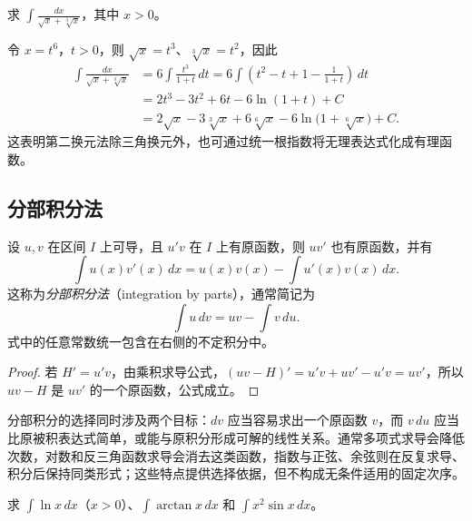 \begin{example}
\label{ex:common-denominator-substitution-for-radicals}
求 $\displaystyle\int\frac{dx}{\sqrt{x}+\sqrt[3]{x}}$，其中 $x>0$。
\end{example}

\begin{solve}
令 $x=t^6$，$t>0$，则 $\sqrt{x}=t^3$、$\sqrt[3]{x}=t^2$，因此
\begin{align*}
    \int\frac{dx}{\sqrt{x}+\sqrt[3]{x}}
       &=6\int\frac{t^3}{1+t}\,dt
        =6\int\left(t^2-t+1-\frac1{1+t}\right)\,dt\\
       &=2t^3-3t^2+6t-6\ln(1+t)+C\\
       &=2\sqrt{x}-3\sqrt[3]{x}+6\sqrt[6]{x}
           -6\ln\bigl(1+\sqrt[6]{x}\bigr)+C.
\end{align*}
这表明第二换元法除三角换元外，也可通过统一根指数将无理表达式化成有理函数。
\end{solve}

\subsection{分部积分法}
\label{subsec:integration-by-parts}

\begin{theorem}[分部积分公式]
\label{thm:integration-by-parts-indefinite}
设 $u,v$ 在区间 $I$ 上可导，且 $u'v$ 在 $I$ 上有原函数，则 $uv'$ 也有原函数，并有
\begin{equation}
    \int u(x)v'(x)\,dx=u(x)v(x)-\int u'(x)v(x)\,dx.
    \label{eq:integration-by-parts-indefinite}
\end{equation}
这称为\emph{分部积分法}（integration by parts），通常简记为
\[
    \int u\,dv=uv-\int v\,du.
\]
式中的任意常数统一包含在右侧的不定积分中。
\end{theorem}

\begin{proof}
若 $H'=u'v$，由乘积求导公式，$(uv-H)'=u'v+uv'-u'v=uv'$，所以 $uv-H$ 是 $uv'$ 的一个原函数，公式成立。
\end{proof}

分部积分的选择同时涉及两个目标：$dv$ 应当容易求出一个原函数 $v$，而 $v\,du$ 应当比原被积表达式简单，或能与原积分形成可解的线性关系。通常多项式求导会降低次数，对数和反三角函数求导会消去这类函数，指数与正弦、余弦则在反复求导、积分后保持同类形式；这些特点提供选择依据，但不构成无条件适用的固定次序。

\begin{example}
\label{ex:integration-by-parts-basic-examples}
求 $\displaystyle\int\ln x\,dx$（$x>0$）、$\displaystyle\int\arctan x\,dx$ 和 $\displaystyle\int x^2\sin x\,dx$。
\end{example}

